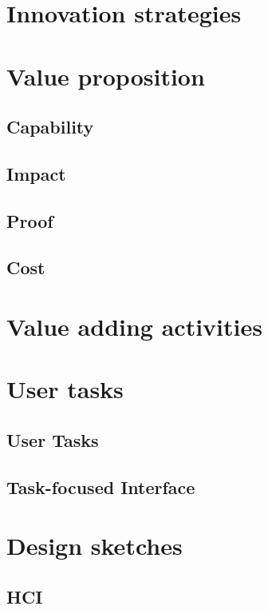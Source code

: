 \documentclass[a4paper,11pt,fleqn,dvipsnames,oneside,openright]{memoir}
\begin{document}
\chapter{Innovation strategies}



\chapter{Value proposition}
\label{ValueProposition}
\section{Capability}

\section{Impact}

\section{Proof}

\section{Cost}


\chapter{Value adding activities}


\chapter{User tasks}
\section{User Tasks}

\section{Task-focused Interface}


\chapter{Design sketches}
\section{HCI}

\end{document}
